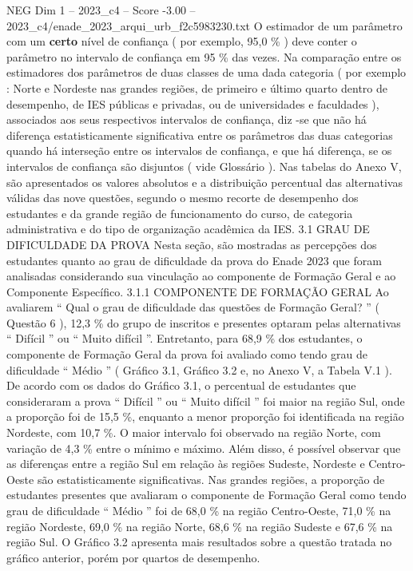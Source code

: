 \begin{textsample}{NEG Dim 1 – 2023\_c4 – Score -3.00 – 2023\_c4/enade\_2023\_arqui\_urb\_f2c5983230.txt}
O estimador de um parâmetro com um \textbf{certo} nível de confiança ( por exemplo, 95,0 \% ) deve conter o parâmetro no intervalo de confiança em 95 \% das vezes.
Na comparação entre os estimadores dos parâmetros de duas classes de uma dada categoria ( por exemplo : Norte e Nordeste nas grandes regiões, de primeiro e último quarto dentro de desempenho, de IES públicas e privadas, ou de universidades e faculdades ), associados aos seus respectivos intervalos de confiança, diz -se que não há diferença estatisticamente significativa entre os parâmetros das duas categorias quando há interseção entre os intervalos de confiança, e que há diferença, se os intervalos de confiança são disjuntos ( vide Glossário ).
Nas tabelas do Anexo V, são apresentados os valores absolutos e a distribuição percentual das alternativas válidas das nove questões, segundo o mesmo recorte de desempenho dos estudantes e da grande região de funcionamento do curso, de categoria administrativa e do tipo de organização acadêmica da IES. 3.1 GRAU DE DIFICULDADE DA PROVA Nesta seção, são mostradas as percepções dos estudantes quanto ao grau de dificuldade da prova do Enade 2023 que foram analisadas considerando sua vinculação ao componente de Formação Geral e ao Componente Específico. 3.1.1 COMPONENTE DE FORMAÇÃO GERAL Ao avaliarem “ Qual o grau de dificuldade das questões de Formação Geral? ” ( Questão 6 ), 12,3 \% do grupo de inscritos e presentes optaram pelas alternativas “ Difícil ” ou “ Muito difícil ”.
Entretanto, para 68,9 \% dos estudantes, o componente de Formação Geral da prova foi avaliado como tendo grau de dificuldade “ Médio ” ( Gráfico 3.1, Gráfico 3.2 e, no Anexo V, a Tabela V.1 ).
De acordo com os dados do Gráfico 3.1, o percentual de estudantes que consideraram a prova “ Difícil ” ou “ Muito difícil ” foi maior na região Sul, onde a proporção foi de 15,5 \%, enquanto a menor proporção foi identificada na região Nordeste, com 10,7 \%.
O maior intervalo foi observado na região Norte, com variação de 4,3 \% entre o mínimo e máximo.
Além disso, é possível observar que as diferenças entre a região Sul em relação às regiões Sudeste, Nordeste e Centro-Oeste são estatisticamente significativas.
Nas grandes regiões, a proporção de estudantes presentes que avaliaram o componente de Formação Geral como tendo grau de dificuldade “ Médio ” foi de 68,0 \% na região Centro-Oeste, 71,0 \% na região Nordeste, 69,0 \% na região Norte, 68,6 \% na região Sudeste e 67,6 \% na região Sul.
O Gráfico 3.2 apresenta mais resultados sobre a questão tratada no gráfico anterior, porém por quartos de desempenho.

\end{textsample}
